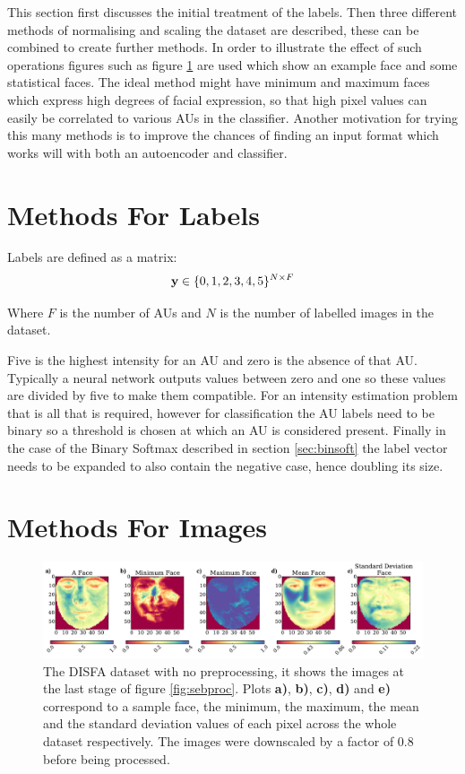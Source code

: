     This section first discusses the initial treatment of the labels.
    Then three different methods of normalising and scaling
    the dataset are described, these can be combined to create further methods. In order to illustrate
    the effect of such operations figures such as figure \ref{fig:faces_none} are used which
    show an example face and some statistical faces. The ideal method might
    have minimum and maximum faces which express high degrees of facial expression, so that
    high pixel values can easily be correlated to various AUs in the classifier. Another motivation
    for trying this many methods is to improve the chances of finding an input format which works will with both an
    autoencoder and classifier.

    \section{Methods For Labels}

      Labels are defined as a matrix:
      \begin{equation}
        {\bf y} \in \{0,1,2,3,4,5\}^{N\times F}
      \end{equation}

      Where $F$ is the number of AUs and $N$ is the number of labelled images
      in the dataset.

      Five is the highest intensity for an AU and zero is the absence of that
      AU. Typically a neural network outputs values between zero and one so
      these values are divided by five to make them compatible. For an intensity
      estimation problem that is all that is required, however for
      classification the AU labels need to be binary so a threshold is chosen at
      which an AU is considered present. Finally in the case of the Binary
      Softmax described in section \ref{sec:binsoft} the label vector needs to
      be expanded to also contain the negative case, hence doubling its size.

  \section{Methods For Images} \label{sec:methods}

    \begin{figure}[!h] \centering
    \includegraphics[width =\hsize]{figures/faces.pdf}
    \caption{The DISFA dataset with no preprocessing, it shows
    the images at the last stage of figure \ref{fig:sebproc}.
    Plots {\bf a)}, {\bf b)}, {\bf c)}, {\bf d)} and {\bf e)}
    correspond to a sample face, the minimum, the maximum,
    the mean and the standard deviation values of each pixel across
    the whole dataset respectively. The images were downscaled by a factor of 0.8 before being processed.}
    \label{fig:faces_none} \end{figure}


